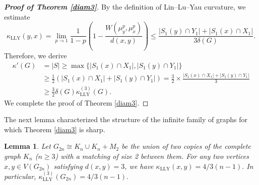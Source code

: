 \documentclass[11pt,bezier]{article}
\newtheorem{lemma}{Lemma}[section]
\theoremstyle{definition}
\theoremstyle{definition}
\theoremstyle{nonumber}
\begin{document}
\begin{proof}[\bf{Proof of Theorem \ref{diam3}}]
By the definition of Lin--Lu--Yau curvature, we estimate
$$
\kappa_{\mathrm{LLY}}(y, x) = \lim_{p \to 1} \frac{1}{1-p} \left( 1 - \frac{W(\mu_y^p, \mu_x^p)}{d(x, y)} \right) \leq \frac{|S_1(y) \cap Y_1| + |S_1(x) \cap X_1|}{3\delta(G)}.
$$
Therefore, we derive
\begin{align*}
\kappa'(G) &= |S| \geq \max\{|S_1(x) \cap X_1|, |S_1(y) \cap Y_1|\}\\
&\geq \frac{1}{2} (|S_1(x) \cap X_1| + |S_1(y) \cap Y_1|) = \frac{3}{2} \times \frac{|S_1(x) \cap X_1| + |S_1(y) \cap Y_1|}{3}\\
&\geq \frac{3}{2}\delta(G) \kappa_{\mathrm{LLY}}^{(3)}(G).
\end{align*}
We complete the proof of Theorem \ref{diam3}.
\end{proof}

The next lemma characterized the structure of the infinite family of graphs for which Theorem \ref{diam3} is sharp.

\begin{lemma} \label{distance3}
Let $G_{2n}\cong K_n \cup K_n +M_2$ be the union of two copies of the complete graph $K_n$ ($n\geq3$) with a matching of size 2 between them. 
For any two vertices $x,y\in V(G_{2n})$ satisfying $d(x,y)=3$, we have
$\kappa_{\mathrm{LLY}}(x,y)=4/3(n-1).$
In particular, $\kappa_{\mathrm{LLY}}^{(3)}(G_{2n})=4/3(n-1).$
\end{lemma}
\end{document}
